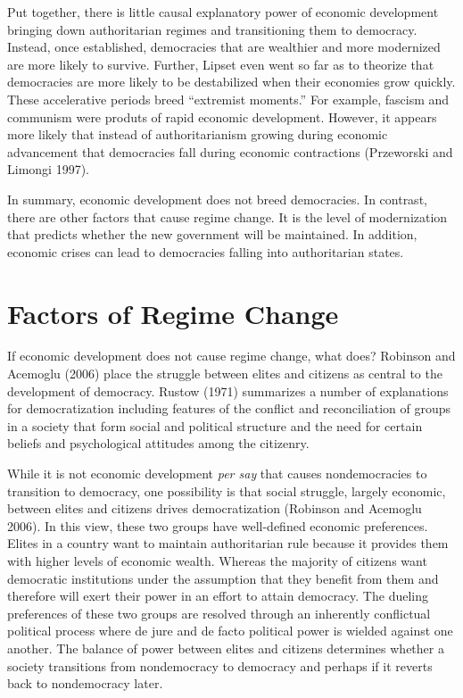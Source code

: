 \documentclass[12pt,]{article}
\begin{document}
Put together, there is little causal explanatory power of economic
development bringing down authoritarian regimes and transitioning them
to democracy. Instead, once established, democracies that are wealthier
and more modernized are more likely to survive. Further, Lipset even
went so far as to theorize that democracies are more likely to be
destabilized when their economies grow quickly. These accelerative
periods breed ``extremist moments.'' For example, fascism and communism
were produts of rapid economic development. However, it appears more
likely that instead of authoritarianism growing during economic
advancement that democracies fall during economic contractions
(Przeworski and Limongi 1997).

In summary, economic development does not breed democracies. In
contrast, there are other factors that cause regime change. It is the
level of modernization that predicts whether the new government will be
maintained. In addition, economic crises can lead to democracies falling
into authoritarian states.

\hypertarget{factors-of-regime-change}{%
\section{Factors of Regime Change}\label{factors-of-regime-change}}

If economic development does not cause regime change, what does?
Robinson and Acemoglu (2006) place the struggle between elites and
citizens as central to the development of democracy. Rustow (1971)
summarizes a number of explanations for democratization including
features of the conflict and reconciliation of groups in a society that
form social and political structure and the need for certain beliefs and
psychological attitudes among the citizenry.

While it is not economic development \emph{per say} that causes
nondemocracies to transition to democracy, one possibility is that
social struggle, largely economic, between elites and citizens drives
democratization (Robinson and Acemoglu 2006). In this view, these two
groups have well-defined economic preferences. Elites in a country want
to maintain authoritarian rule because it provides them with higher
levels of economic wealth. Whereas the majority of citizens want
democratic institutions under the assumption that they benefit from them
and therefore will exert their power in an effort to attain democracy.
The dueling preferences of these two groups are resolved through an
inherently conflictual political process where de jure and de facto
political power is wielded against one another. The balance of power
between elites and citizens determines whether a society transitions
from nondemocracy to democracy and perhaps if it reverts back to
nondemocracy later.
\end{document}
